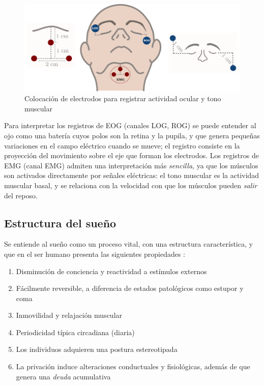 \begin{figure}
\centering
\includegraphics[width=\linewidth]
{./img_diagramas/emg_eog_v4.pdf}
\caption{Colocación de electrodos para registrar actividad ocular y tono muscular}
\label{emg_eog}
\end{figure}

Para interpretar los registros de EOG (canales LOG, ROG) se puede entender al ojo como una batería
cuyos  polos son la retina y la pupila, y que genera pequeñas variaciones en el campo eléctrico
cuando se mueve; el registro consiste en la proyección del movimiento sobre el eje que forman los
electrodos.
%
Los registros de EMG (canal EMG) admiten una interpretación más \textit{sencilla}, ya que los
músculos son activados directamente por señales eléctricas: el tono muscular es la actividad 
muscular basal, y se relaciona con la velocidad con que los músculos pueden \textit{salir} del 
reposo.


\subsection{Estructura del sueño}

Se entiende al sueño como un proceso vital, con una estructura característica, y que en el ser 
humano presenta las siguientes propiedades \cite{CarrilloMora}:
\begin{enumerate}
\item Disminución de conciencia y reactividad a estímulos externos
\item Fácilmente reversible, a diferencia de estados patológicos como estupor y coma
\item Inmovilidad y relajación muscular
\item Periodicidad típica circadiana (diaria)
\item Los individuos adquieren una postura estereotipada
\item La privación induce alteraciones conductuales y 
fisiológicas, además de que genera una \textit{deuda} acumulativa
\end{enumerate}

